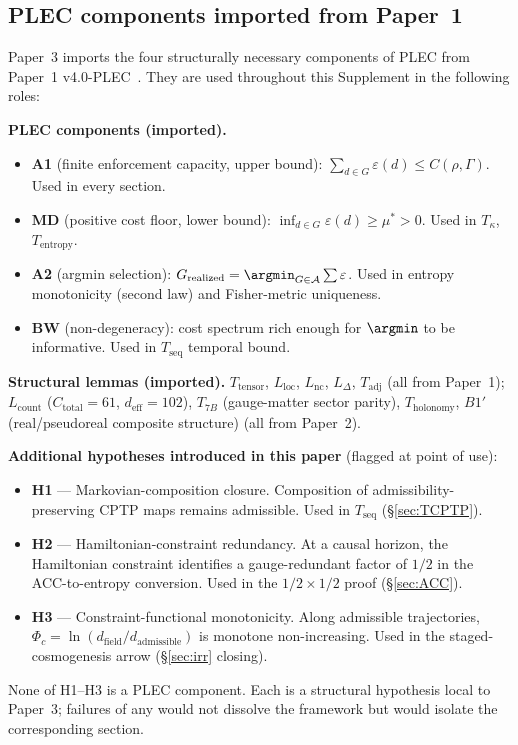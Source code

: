 \documentclass[11pt]{article}
\theoremstyle{remark}
\begin{document}
\subsection{PLEC components imported from Paper~1}

Paper~3 imports the four structurally necessary components of PLEC from
Paper~1 v4.0-PLEC~\cite{Paper1}.  They are used throughout this Supplement
in the following roles:

\begin{tcolorbox}[apfbox, title={Inputs, Constitutive Principles, and Honest Flags}]
\textbf{PLEC components (imported).}
\begin{itemize}
  \item \textbf{A1} (finite enforcement capacity, upper bound): $\sum_{d \in G}\varepsilon(d) \le C(\rho,\Gamma)$.  Used in every section.
  \item \textbf{MD} (positive cost floor, lower bound): $\inf_{d \in G}\varepsilon(d) \ge \mu^* > 0$.  Used in $T_\kappa$, $T_{\mathrm{entropy}}$.
  \item \textbf{A2} (argmin selection): $G_{\mathrm{realized}} = \argmin_{G \in \mathcal{A}} \sum \varepsilon$.  Used in entropy monotonicity (second law) and Fisher-metric uniqueness.
  \item \textbf{BW} (non-degeneracy): cost spectrum rich enough for $\argmin$ to be informative.  Used in $T_{\mathrm{seq}}$ temporal bound.
\end{itemize}

\textbf{Structural lemmas (imported).}
$T_{\mathrm{tensor}}$, $L_{\mathrm{loc}}$, $L_{\mathrm{nc}}$, $L_\Delta$,
$T_{\mathrm{adj}}$ (all from Paper~1); $L_{\mathrm{count}}$ ($C_{\mathrm{total}}=61$,
$d_{\mathrm{eff}}=102$), $T_{7B}$ (gauge-matter sector parity), $T_{\mathrm{holonomy}}$,
$B1'$ (real/pseudoreal composite structure) (all from Paper~2).

\textbf{Additional hypotheses introduced in this paper} (flagged at point of use):
\begin{itemize}
  \item \textbf{H1} --- Markovian-composition closure.  Composition of admissibility-preserving CPTP maps remains admissible.  Used in $T_{\mathrm{seq}}$ (\S\ref{sec:TCPTP}).
  \item \textbf{H2} --- Hamiltonian-constraint redundancy.  At a causal horizon, the Hamiltonian constraint identifies a gauge-redundant factor of $1/2$ in the ACC-to-entropy conversion.  Used in the $1/2 \times 1/2$ proof (\S\ref{sec:ACC}).
  \item \textbf{H3} --- Constraint-functional monotonicity.  Along admissible trajectories, $\Phi_c = \ln(d_{\mathrm{field}}/d_{\mathrm{admissible}})$ is monotone non-increasing.  Used in the staged-cosmogenesis arrow (\S\ref{sec:irr} closing).
\end{itemize}

None of H1--H3 is a PLEC component.  Each is a structural hypothesis local
to Paper~3; failures of any would not dissolve the framework but would
isolate the corresponding section.
\end{tcolorbox}
\end{document}
